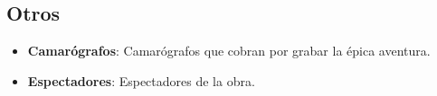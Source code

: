 \subsection{Otros}
\begin{itemize}
    \item \textbf{Camarógrafos}: Camarógrafos que cobran por grabar la épica aventura.
    \item \textbf{Espectadores}: Espectadores de la obra.
\end{itemize}